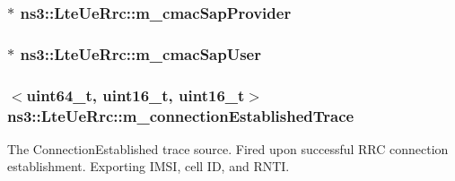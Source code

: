 \subsubsection[{\texorpdfstring{m\+\_\+cmac\+Sap\+Provider}{m_cmacSapProvider}}]{$\ast$ ns3\+::\+Lte\+Ue\+Rrc\+::m\+\_\+cmac\+Sap\+Provider\hspace{0.3cm}{\ttfamily [private]}}\hypertarget{classns3_1_1LteUeRrc_a5a7bffd2040d73eb5db1aaef849d0396}{}\label{classns3_1_1LteUeRrc_a5a7bffd2040d73eb5db1aaef849d0396}
\subsubsection[{\texorpdfstring{m\+\_\+cmac\+Sap\+User}{m_cmacSapUser}}]{$\ast$ ns3\+::\+Lte\+Ue\+Rrc\+::m\+\_\+cmac\+Sap\+User\hspace{0.3cm}{\ttfamily [private]}}\hypertarget{classns3_1_1LteUeRrc_a4bc512cb0812f661cd5a69b6cfb6866f}{}\label{classns3_1_1LteUeRrc_a4bc512cb0812f661cd5a69b6cfb6866f}
\subsubsection[{\texorpdfstring{m\+\_\+connection\+Established\+Trace}{m_connectionEstablishedTrace}}]{$<$uint64\+\_\+t, uint16\+\_\+t, uint16\+\_\+t$>$ ns3\+::\+Lte\+Ue\+Rrc\+::m\+\_\+connection\+Established\+Trace\hspace{0.3cm}{\ttfamily [private]}}\hypertarget{classns3_1_1LteUeRrc_a698ac3b66bd6073dcab222d72bf2745e}{}\label{classns3_1_1LteUeRrc_a698ac3b66bd6073dcab222d72bf2745e}
The {\ttfamily Connection\+Established} trace source. Fired upon successful R\+RC connection establishment. Exporting I\+M\+SI, cell ID, and R\+N\+TI. 
